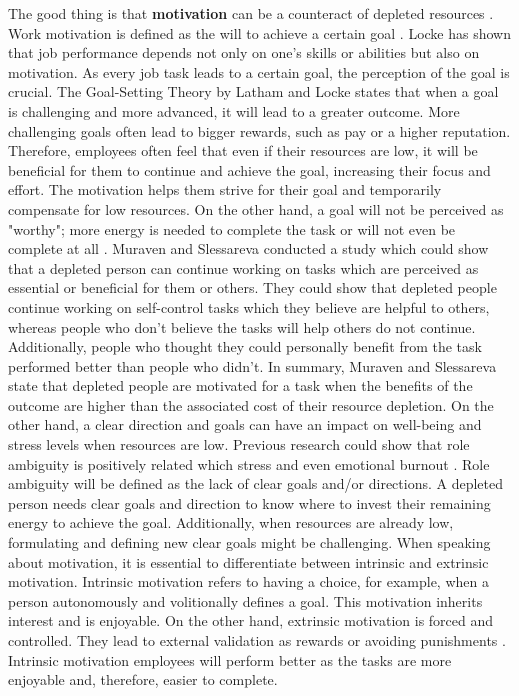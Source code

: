\documentclass{hasel_thesis}
\begin{document}
The good thing is that \textbf{motivation} can be a counteract of depleted resources \cite{Bandura.1986}. Work motivation is defined as the will to achieve a certain goal \cite{Locke.2004}. Locke \cite{Locke2000} has shown that job performance depends not only on one's skills or abilities but also on motivation. As every job task leads to a certain goal, the perception of the goal is crucial. The Goal-Setting Theory by Latham and Locke \cite{Latham.1991} states that when a goal is challenging and more advanced, it will lead to a greater outcome. More challenging goals often lead to bigger rewards, such as pay or a higher reputation. Therefore, employees often feel that even if their resources are low, it will be beneficial for them to continue and achieve the goal, increasing their focus and effort. The motivation helps them strive for their goal and temporarily compensate for low resources. On the other hand, a goal will not be perceived as "worthy"; more energy is needed to complete the task or will not even be complete at all \cite{Trougakos.2009}. Muraven and Slessareva \cite{Muraven.2003} conducted a study which could show that a depleted person can continue working on tasks which are perceived as essential or beneficial for them or others. They could show that depleted people continue working on self-control tasks which they believe are helpful to others, whereas people who don't believe the tasks will help others do not continue. Additionally, people who thought they could personally benefit from the task performed better than people who didn't. In summary, Muraven and Slessareva \cite{Muraven.2003} state that depleted people are motivated for a task when the benefits of the outcome are higher than the associated cost of their resource depletion. On the other hand, a clear direction and goals can have an impact on well-being and stress levels when resources are low. Previous research could show that role ambiguity is positively related which stress and even emotional burnout \cite{Posig.2003}. Role ambiguity will be defined as the lack of clear goals and/or directions. A depleted person needs clear goals and direction to know where to invest their remaining energy to achieve the goal. Additionally, when resources are already low, formulating and defining new clear goals might be challenging. When speaking about motivation, it is essential to differentiate between intrinsic and extrinsic motivation. Intrinsic motivation refers to having a choice, for example, when a person autonomously and volitionally defines a goal. This motivation inherits interest and is enjoyable. On the other hand, extrinsic motivation is forced and controlled. They lead to external validation as rewards or avoiding punishments \cite{Ryan.2000}. Intrinsic motivation employees will perform better as the tasks are more enjoyable and, therefore, easier to complete.
\end{document}
